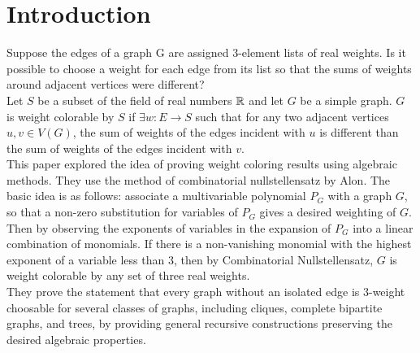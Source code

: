 \section{Introduction}
Suppose the edges of a graph G are assigned 3-element lists of real weights. Is it possible to choose a weight for each edge from its list so that the sums of weights around adjacent vertices were different? 
\\
Let $S$ be a subset of the field of real numbers ${\mathbb{R}}$ and let $G$ be a simple graph. $G$ is weight colorable by $S$ if $\exists w : E \rightarrow S$ such that for any two adjacent vertices $u, v \in V(G)$, the sum of weights of the edges incident with $u$ is different than the sum of weights of the edges incident with $v$.
\\
This paper explored the idea of proving weight coloring results using algebraic methods. They use the method of combinatorial nullstellensatz by Alon. The basic idea is as follows: associate a multivariable polynomial $P_G$ with a graph $G$, so that a non-zero substitution for variables of $P_G$ gives a desired weighting of $G$. Then by observing the exponents of variables in the expansion of $P_G$ into a linear combination of monomials. If there is a non-vanishing monomial with the highest exponent of a variable less than $3$, then by Combinatorial Nullstellensatz, $G$ is weight colorable by any set of three real weights.
\\
They prove the statement that every graph without an isolated edge is $3$-weight choosable for several classes of graphs, including cliques, complete bipartite graphs, and trees, by providing general recursive constructions preserving the desired algebraic properties.